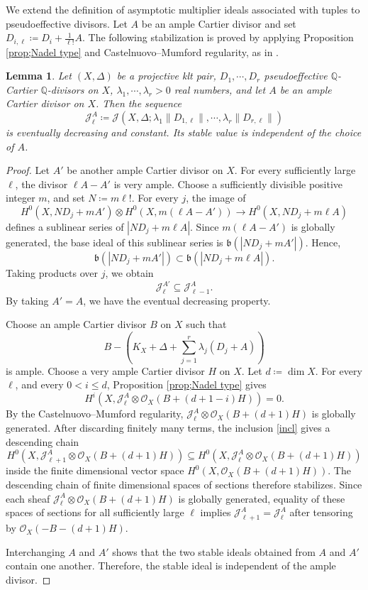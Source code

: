 \documentclass[a4paper,12pt]{amsart}
\newtheorem{lemma}[theorem]{Lemma}
\theoremstyle{plain}
\theoremstyle{definition}
\numberwithin{equation}{section}
\newcommand{\Q}{\mathbb{Q}}
\newcommand{\OO}{\mathcal{O}}
\begin{document}
We extend the definition of asymptotic multiplier ideals associated with tuples to pseudoeffective divisors. Let \(A\) be an ample Cartier divisor and set \(D_{i,\ell}\coloneqq D_i+\frac{1}{\ell !}A\). The following stabilization is proved by applying Proposition \ref{prop;Nadel type} and Castelnuovo--Mumford regularity, as in \cite[Proposition 3.10 and Lemma 3.11]{CJKL}.

\begin{lemma}\label{lem;decrease}
Let $(X,\Delta)$ be a projective klt pair, $D_1,\cdots,D_r$ pseudoeffective $\Q$-Cartier $\Q$-divisors on $X$, $\lambda_1,\cdots,\lambda_r>0$ real numbers, and let $A$ be an ample Cartier divisor on $X$. Then the sequence
\[
\mathcal{J}_{\ell}^A\coloneqq \mathcal{J}\left(X,\Delta;\lambda_1\|D_{1,\ell}\|,\cdots,\lambda_r\|D_{r,\ell}\|\right)
\]
is eventually decreasing and constant. Its stable value is independent of the choice of \(A\).
\end{lemma}

\begin{proof}
Let $A'$ be another ample Cartier divisor on $X$. For every sufficiently large \(\ell\), the divisor \(\ell A-A'\) is very ample. Choose a sufficiently divisible positive integer \(m\), and set \(N\coloneqq m\ell!\). For every \(j\), the image of 
\[
H^0(X,ND_j+mA')\otimes H^0(X,m(\ell A-A'))\longrightarrow H^0(X,ND_j+m\ell A)
\]
defines a sublinear series of \(|ND_j+m\ell A|\). Since \(m(\ell A-A')\) is globally generated, the base ideal of this sublinear series is \(\mathfrak{b}(|ND_j+mA'|)\). Hence, 
\[
\mathfrak{b}(|ND_j+mA'|)\subset \mathfrak{b}(|ND_j+m\ell A|).
\]
Taking products over \(j\), we obtain 
\begin{equation}\label{incl}
    \mathcal{J}_{\ell}^{A'}\subseteq \mathcal{J}_{\ell-1}^A.
\end{equation} 
By taking \(A'=A\), we have the eventual decreasing property.

Choose an ample Cartier divisor \(B\) on \(X\) such that 
\[
B-\left(K_X+\Delta+\sum_{j=1}^r \lambda_j(D_j+A)\right)
\]
is ample. Choose a very ample Cartier divisor \(H\) on \(X\). Let $d\coloneqq \dim X$. For every \(\ell\), and every \(0<i\le d\), Proposition \ref{prop;Nadel type} gives
\[
H^i(X,\mathcal{J}_{\ell}^A \otimes \OO_X(B+(d+1-i)H))=0.
\]
By the Castelnuovo--Mumford regularity, \(\mathcal{J}_{\ell}^A \otimes \OO_X(B+(d+1)H)\) is globally generated. After discarding finitely many terms, the inclusion \eqref{incl} gives a descending chain
\[
H^0(X,\mathcal{J}_{\ell+1}^A \otimes \OO_X(B+(d+1)H))\subseteq H^0(X,\mathcal{J}_{\ell}^A \otimes \OO_X(B+(d+1)H))
\]
inside the finite dimensional vector space \(H^0(X,\OO_X(B+(d+1)H))\). The descending chain of finite dimensional spaces of sections therefore stabilizes. Since each sheaf $\mathcal{J}_{\ell}^A\otimes \OO_X(B+(d+1)H)$ is globally generated, equality of these spaces of sections for all sufficiently large $\ell$ implies $\mathcal{J}_{\ell+1}^A=\mathcal{J}_{\ell}^A$ after tensoring by $\OO_X(-B-(d+1)H)$.

Interchanging \(A\) and \(A'\) shows that the two stable ideals obtained from $A$ and $A'$ contain one another. Therefore, the stable ideal is independent of the ample divisor.
\end{proof}
\end{document}
